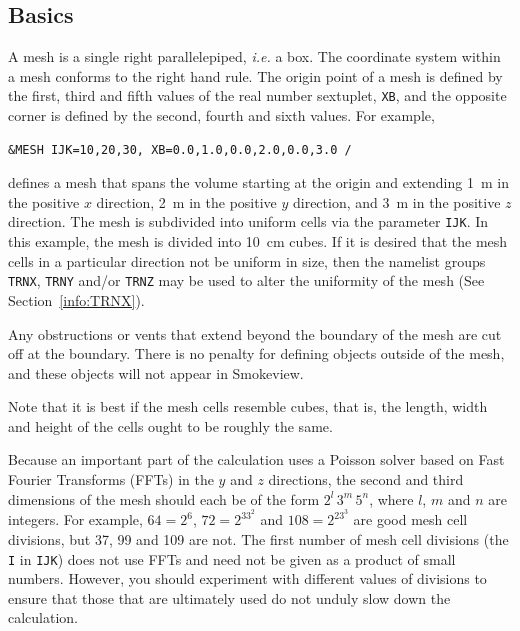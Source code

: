 \documentclass[11pt]{book}
\newcommand{\ct}{\tt\small}
\begin{document}
\subsection{Basics}
\label{info:MESH_Basics}

A mesh is a single right parallelepiped, {\em i.e.} a box.
The coordinate system within a mesh conforms to the right hand rule.
The origin point of a mesh is defined by the first, third
and fifth values of the real number sextuplet, {\ct XB}, and the opposite
corner is defined by the second, fourth and sixth values.
For example,

\footnotesize
\begin{verbatim}
&MESH IJK=10,20,30, XB=0.0,1.0,0.0,2.0,0.0,3.0 /
\end{verbatim}

\normalsize
\noindent
defines a mesh that spans the volume starting at the origin and extending 1~m in the positive
$x$ direction, 2~m in the positive $y$ direction, and 3~m in the positive $z$ direction.
The mesh is subdivided into uniform cells via the parameter
{\ct IJK}. In this example, the mesh is divided into 10~cm cubes.
If it is desired that the mesh cells in a particular direction not be uniform in size,
then the namelist groups {\ct TRNX}, {\ct TRNY} and/or {\ct TRNZ} may be used to alter the
uniformity of the mesh (See Section~\ref{info:TRNX}).

Any obstructions or vents that extend beyond the boundary of the mesh
are cut off at the boundary. There is no penalty for defining objects
outside of the mesh, and these objects will not appear in Smokeview.

\begin{warning}
\noindent
Note that it is best if the mesh cells resemble cubes, that is, the
length, width and height of the cells ought to be roughly the same.
\end{warning}

\noindent
Because an important part of the calculation uses a Poisson solver based on
Fast Fourier Transforms (FFTs) in the $y$ and $z$ directions, the second and third dimensions
of the mesh should each be of the form $2^l \, 3^m \, 5^n$, where
$l$, $m$ and $n$ are integers. For example,
$64=2^6$, $72=2^33^2$ and $108=2^23^3$ are good mesh cell divisions, but 37, 99 and 109 are not.
The first number of mesh cell divisions (the {\ct I} in {\ct IJK}) does not use FFTs and need not be given as a
product of small numbers. However, you should experiment with different values of
divisions to ensure that those that are ultimately used do not unduly slow down the calculation.
\end{document}

